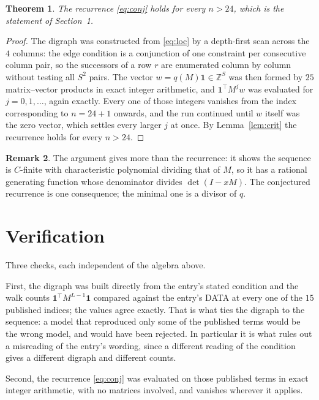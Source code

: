 \documentclass[11pt,a4paper]{article}
\theoremstyle{plain}
\newtheorem{theorem}{Theorem}
\theoremstyle{definition}
\newtheorem{remark}[theorem]{Remark}
\begin{document}
\begin{theorem}
The recurrence \eqref{eq:conj} holds for every $n>24$, which is the statement of
Section~1.
\end{theorem}

\begin{proof}
The digraph was constructed from \eqref{eq:loc} by a depth-first scan across the $4$
columns: the edge condition is a conjunction of one constraint per consecutive column
pair, so the successors of a row $r$ are enumerated column by column without testing all
$S^2$ pairs. The vector $w=q(M)\mathbf{1}\in\mathbb{Z}^{S}$ was then formed by $25$
matrix--vector products in exact integer arithmetic, and $\mathbf{1}^{\!\top}M^{j}w$ was
evaluated for $j=0,1,\dots$, again exactly. Every one of those integers vanishes from the
index corresponding to $n=24+1$ onwards, and the run continued until $w$ itself was the
zero vector, which settles every larger $j$ at once. By Lemma~\ref{lem:crit} the recurrence
holds for every $n>24$.
\end{proof}

\begin{remark}
The argument gives more than the recurrence: it shows the sequence is $C$-finite with
characteristic polynomial dividing that of $M$, so it has a rational generating function
whose denominator divides $\det(I-xM)$. The conjectured recurrence is one consequence; the
minimal one is a divisor of $q$.
\end{remark}

\section{Verification}

Three checks, each independent of the algebra above.

First, the digraph was built directly from the entry's stated condition and the walk counts
$\mathbf{1}^{\!\top}M^{L-1}\mathbf{1}$ compared against the entry's DATA at
every one of the $15$ published indices; the values agree exactly. That is what ties
the digraph to the sequence: a model that reproduced only some of the published terms would
be the wrong model, and would have been rejected. In particular it is what rules out a
misreading of the entry's wording, since a different reading of the condition gives a
different digraph and different counts.

Second, the recurrence \eqref{eq:conj} was evaluated on those published terms in exact
integer arithmetic, with no matrices involved, and vanishes wherever it applies.
\end{document}
